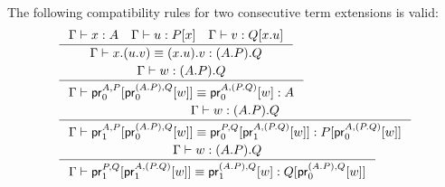 \begin{lem}
The following compatibility rules for two consecutive term extensions is valid:
\begin{align*}
& \inference{\jterm{\Gamma}{A}{x}\quad\jterm{\Gamma}{\subst{x}{P}}{u}\quad\jterm{\Gamma}{\subst{\ctxext{x}{u}}{Q}}{v}}
{\jtermeq{\Gamma}{\ctxext{{A}{P}}{Q}}{\ctxext{x}{{u}{v}}}{\ctxext{{x}{u}}{v}}}\\
& \inference{\jterm{\Gamma}{\ctxext{{A}{P}}{Q}}{w}}
  {\jtermeq{\Gamma}{A}{\cprojfst{A}{P}{\cprojfst{\ctxext{A}{P}}{Q}{w}}}{\cprojfst{A}{\ctxext{P}{Q}}{w}}}\\
& \inference{\jterm{\Gamma}{\ctxext{{A}{P}}{Q}}{w}}
  {\jtermeq{\Gamma}{\subst{\cprojfst{A}{\ctxext{P}{Q}}{w}}{P}}
  {\cprojsnd{A}{P}{\cprojfst{\ctxext{A}{P}}{Q}{w}}}
  {\cprojfst{P}{Q}{\cprojsnd{A}{\ctxext{P}{Q}}{w}}}}\\
& \inference{\jterm{\Gamma}{\ctxext{{A}{P}}{Q}}{w}}
  {\jtermeq{\Gamma}{\subst{\cprojfst{\ctxext{A}{P}}{Q}{w}}{Q}}
  {\cprojsnd{P}{Q}{\cprojsnd{A}{\ctxext{P}{Q}}{w}}}
  {\cprojsnd{\ctxext{A}{P}}{Q}{w}}}
\end{align*}
\end{lem}


